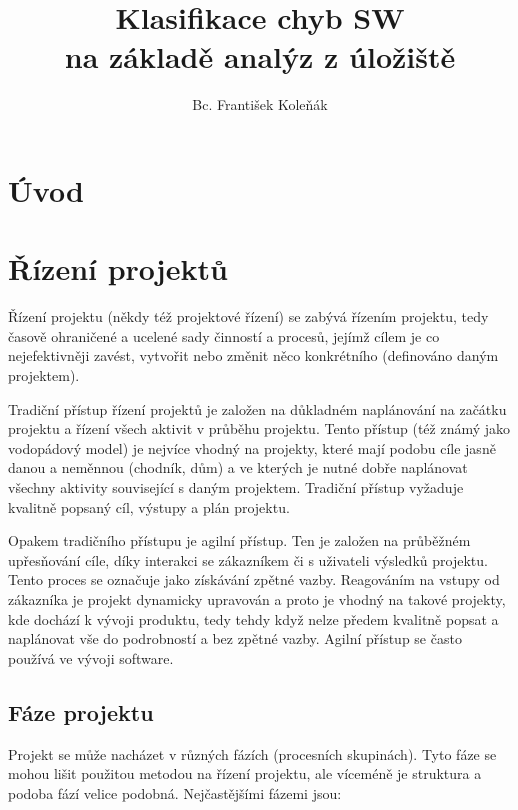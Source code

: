 \documentclass[czech,DP]{thesiskiv}
\author{Bc. František Koleňák}
\title{Klasifikace chyb SW \\na základě analýz z úložiště}
\begin{document}
%
\maketitle

\tableofcontents
\thispagestyle{empty}

\chapter{Úvod}
\setcounter{page}{1}
 
\newpage

\chapter{Řízení projektů}
Řízení projektu (někdy též projektové řízení) se zabývá řízením projektu, tedy časově ohraničené a ucelené sady činností a procesů, jejímž cílem je co nejefektivněji zavést, vytvořit nebo změnit něco konkrétního (definováno daným projektem).

Tradiční přístup řízení projektů je založen na důkladném naplánování na začátku projektu a řízení všech aktivit v průběhu projektu. Tento přístup (též známý jako vodopádový model) je nejvíce vhodný na projekty, které mají podobu cíle jasně danou a neměnnou (chodník, dům) a ve kterých je nutné dobře naplánovat všechny aktivity související s daným projektem. Tradiční přístup vyžaduje kvalitně popsaný cíl, výstupy a plán projektu.

Opakem tradičního přístupu je agilní přístup. Ten je založen na průběžném upřesňování cíle, díky interakci se zákazníkem či s uživateli výsledků projektu. Tento proces se označuje jako získávání zpětné vazby. Reagováním na vstupy od zákazníka je projekt dynamicky upravován a proto je vhodný na takové projekty, kde dochází k vývoji produktu, tedy tehdy když nelze předem kvalitně popsat a naplánovat vše do podrobností a bez zpětné vazby. Agilní přístup se často používá ve vývoji software.

\section{Fáze projektu}
Projekt se může nacházet v různých fázích (procesních skupinách). Tyto fáze se mohou lišit použitou metodou na řízení projektu, ale víceméně je struktura a podoba fází velice podobná. Nejčastějšími fázemi jsou:
\end{document}
